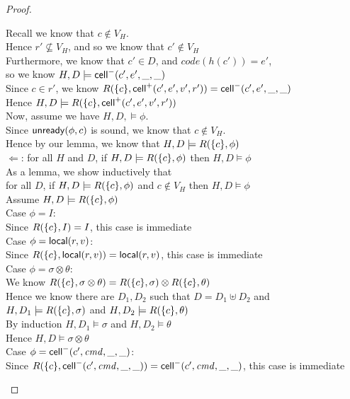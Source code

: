 \begin{proof}
\begin{itemize}
\begin{tabbedproof}
\ooooo Recall we know that $c \not\in V_H$. \\ 
\ooooo Hence $r' \not\subseteq V_H$, and so we know that $c' \not\in V_H$ \\
\ooooo Furthermore, we know that $c' \in D$, and $\mathit{code}(h(c')) = e'$, \\
\oooox so we know $H, D \models \mathsf{cell}^{-}({c'}, {e'}, {\_}, {\_})$ \\
\ooooo Since $c \in r'$, we know $R(\{{c}\}, \mathsf{cell}^{+}({c'}, {e'}, {v'}, {r'})) = \mathsf{cell}^{-}({c'}, {e'}, {\_}, {\_})$ \\
\ooooo Hence $H, D \models R(\{{c}\}, \mathsf{cell}^{+}({c'}, {e'}, {v'}, {r'}))$ \\
\ooo Now, assume we have $H, D, \models \phi$. \\
\ooo Since $\mathsf{unready}({\phi}, {c})$ is sound, we know that $c \not\in V_H$. \\ 
\ooo Hence by our lemma, we know that $H, D \models R(\{{c}\}, \phi)$ \\
\oo $\Leftarrow$: for all $H$ and $D$, if $H, D \models R(\{{c}\}, \phi)$ then $H, D \models \phi$ \\
\ooo As a lemma, we show inductively that \\
\ooox for all $D$, if $H, D \models R(\{{c}\}, \phi)$ and $c \not\in V_H$ then $H, D \models \phi$\\
\ooo Assume $H, D \models R(\{{c}\}, \phi)$ \\ 
\ooo Case $\phi = I$: \\
\oooo Since $R(\{{c}\}, I) = I$, this case is immediate \\
\ooo Case $\phi = \mathsf{local}({r}, {v})$: \\
\oooo Since $R(\{{c}\}, \mathsf{local}({r}, {v})) = \mathsf{local}({r}, {v})$, this case is immediate \\
\ooo Case $\phi = \sigma \otimes \theta$: \\
\oooo We know $R(\{{c}\}, \sigma \otimes \theta) = R(\{{c}\}, \sigma) \otimes R(\{{c}\}, \theta)$ \\
\oooo Hence we know there are $D_1, D_2$ such that $D = D_1 \uplus D_2$ and \\
\ooox $H, D_1 \models R(\{{c}\}, \sigma)$ and $H, D_2 \models R(\{{c}\}, \theta)$ \\
\oooo By induction $H, D_1 \models \sigma$ and $H, D_2 \models \theta$ \\
\oooo Hence $H, D \models \sigma \otimes \theta$ \\
\ooo Case $\phi = \mathsf{cell}^{-}({c'}, {\mathit{cmd}}, {\_}, {\_})$: \\
\oooo Since $R(\{{c}\}, \mathsf{cell}^{-}({c'}, {\mathit{cmd}}, {\_}, {\_})) = \mathsf{cell}^{-}({c'}, {\mathit{cmd}}, {\_}, {\_})$, this case is immediate \\

\end{tabbedproof}
\end{itemize}
\end{proof}
